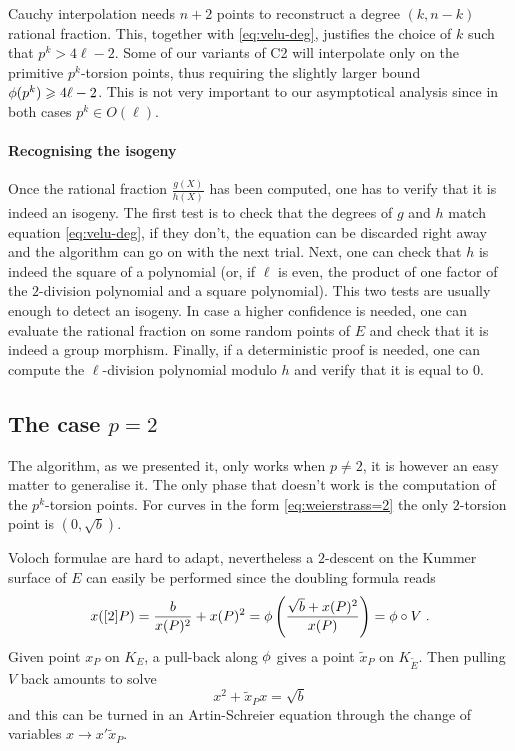Cauchy interpolation needs $n+2$ points to reconstruct a degree
$(k,n-k)$ rational fraction. This, together with \eqref{eq:velu-deg},
justifies the choice of $k$ such that $p^k > 4\ell - 2$. Some of our
variants of C2 will interpolate only on the primitive $p^k$-torsion
points, thus requiring the slightly larger bound $\phi(p^k) \geqslant
4\ell - 2$. This is not very important to our asymptotical analysis
since in both cases $p^k \in O(\ell)$.

\paragraph{Recognising the isogeny}
Once the rational fraction $\frac{g(X)}{h(X)}$ has been computed, one
has to verify that it is indeed an isogeny. The first test is to check
that the degrees of $g$ and $h$ match equation \eqref{eq:velu-deg}, if
they don't, the equation can be discarded right away and the algorithm
can go on with the next trial. Next, one can check that $h$ is indeed
the square of a polynomial (or, if $\ell$ is even, the product of one
factor of the $2$-division polynomial and a square polynomial). This
two tests are usually enough to detect an isogeny. In case a higher
confidence is needed, one can evaluate the rational fraction on some
random points of $E$ and check that it is indeed a group
morphism. Finally, if a deterministic proof is needed, one can compute
the $\ell$-division polynomial modulo $h$ and verify that it is equal
to $0$.


\subsection{The case $p=2$}
\label{sec:p=2}
The algorithm, as we presented it, only works when $p\ne2$, it is
however an easy matter to generalise it. The only phase that doesn't
work is the computation of the $p^k$-torsion points. For curves in the
form \eqref{eq:weierstrass=2} the only $2$-torsion point is
$(0,\sqrt{b})$.

Voloch formulae are hard to adapt, nevertheless a $2$-descent on the
Kummer surface of $E$ can easily be performed since the doubling
formula reads
\begin{equation}
  x([2]P) = \frac{b}{x(P)^2} + x(P)^2 =
  \phi\left(\frac{\sqrt{b} + x(P)^2}{x(P)} \right) = \phi\circ V
  \;\text{.}
\end{equation}
Given point $x_P$ on $K_E$, a pull-back along $\phi$ gives a
point $\tilde{x}_P$ on $K_{\widetilde{E}}$. Then pulling $V$ back
amounts to solve
\begin{equation}
  \label{eq:2-descent}
  x^2 + \tilde{x}_Px = \sqrt{b}
\end{equation}
and this can be turned in an Artin-Schreier equation through the
change of variables $x \rightarrow x'\tilde{x}_P$.

